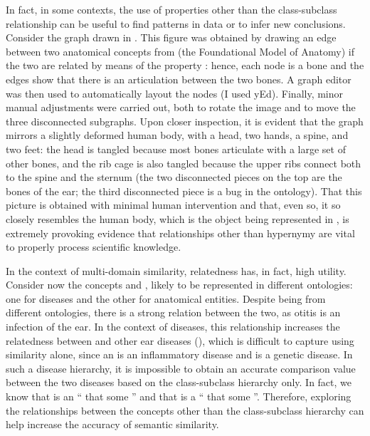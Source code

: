 In fact, in some contexts, the use of properties other than the class-subclass relationship can be useful to find patterns in data or to infer new conclusions. Consider the graph drawn in . This figure was obtained by drawing an edge between two anatomical concepts from  (the Foundational Model of Anatomy) if the two are related by means of the property : hence, each node is a bone and the edges show that there is an articulation between the two bones. A graph editor was then used to automatically layout the nodes (I used yEd). Finally, minor manual adjustments were carried out, both to rotate the image and to move the three disconnected subgraphs. Upon closer inspection, it is evident that the graph mirrors a slightly deformed human body, with a head, two hands, a spine, and two feet: the head is tangled because most bones articulate with a large set of other bones, and the rib cage is also tangled because the upper ribs connect both to the spine and the sternum (the two disconnected pieces on the top are the bones of the ear; the third disconnected piece is a bug in the ontology). That this picture is obtained with minimal human intervention and that, even so, it so closely resembles the human body, which is the object being represented in , is extremely provoking evidence that relationships other than hypernymy are vital to properly process scientific knowledge.

In the context of multi-domain similarity, relatedness has, in fact, high utility. Consider now the concepts  and , likely to be represented in different ontologies: one for diseases and the other for anatomical entities. Despite being from different ontologies, there is a strong relation between the two, as otitis is an infection of the ear. In the context of diseases, this relationship increases the relatedness between  and other ear diseases (\eg {}), which is difficult to capture using similarity alone, since an  is an inflammatory disease and  is a genetic disease. In such a disease hierarchy, it is impossible to obtain an accurate comparison value between the two diseases based on the class-subclass hierarchy only. In fact, we know that  is an `` that  some '' and that  is a `` that  some ''. Therefore, exploring the relationships between the concepts other than the class-subclass hierarchy can help increase the accuracy of semantic similarity.


